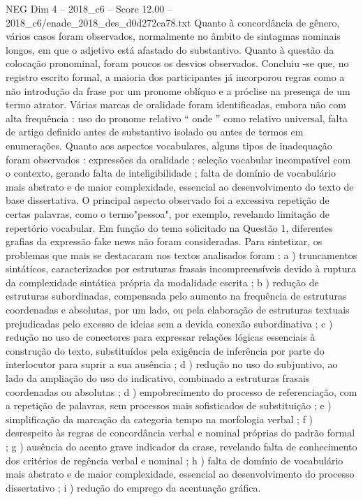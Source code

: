 \begin{textsample}{NEG Dim 4 – 2018\_c6 – Score 12.00 – 2018\_c6/enade\_2018\_des\_d0d272ca78.txt}
Quanto à concordância de gênero, vários casos foram observados, normalmente no âmbito de sintagmas nominais longos, em que o adjetivo está afastado do substantivo.
Quanto à questão da colocação pronominal, foram poucos os desvios observados.
Concluiu -se que, no registro escrito formal, a maioria dos participantes já incorporou regras como a não introdução da frase por um pronome oblíquo e a próclise na presença de um termo atrator.
Várias marcas de oralidade foram identificadas, embora não com alta frequência : uso do pronome relativo “ onde ” como relativo universal, falta de artigo definido antes de substantivo isolado ou antes de termos em enumerações.
Quanto aos aspectos vocabulares, alguns tipos de inadequação foram observados : expressões da oralidade ; seleção vocabular incompatível com o contexto, gerando falta de inteligibilidade ; falta de domínio de vocabulário mais abstrato e de maior complexidade, essencial ao desenvolvimento do texto de base dissertativa.
O principal aspecto observado foi a excessiva repetição de certas palavras, como o termo"pessoa", por exemplo, revelando limitação de repertório vocabular.
Em função do tema solicitado na Questão 1, diferentes grafias da expressão fake news não foram consideradas.
Para sintetizar, os problemas que mais se destacaram nos textos analisados foram : a ) truncamentos sintáticos, caracterizados por estruturas frasais incompreensíveis devido à ruptura da complexidade sintática própria da modalidade escrita ; b ) redução de estruturas subordinadas, compensada pelo aumento na frequência de estruturas coordenadas e absolutas, por um lado, ou pela elaboração de estruturas textuais prejudicadas pelo excesso de ideias sem a devida conexão subordinativa ; c ) redução no uso de conectores para expressar relações lógicas essenciais à construção do texto, substituídos pela exigência de inferência por parte do interlocutor para suprir a sua ausência ; d ) redução no uso do subjuntivo, ao lado da ampliação do uso do indicativo, combinado a estruturas frasais coordenadas ou absolutas ; d ) empobrecimento do processo de referenciação, com a repetição de palavras, sem processos mais sofisticados de substituição ; e ) simplificação da marcação da categoria tempo na morfologia verbal ; f ) desrespeito às regras de concordância verbal e nominal próprias do padrão formal ; g ) ausência do acento grave indicador da crase, revelando falta de conhecimento dos critérios de regência verbal e nominal ; h ) falta de domínio de vocabulário mais abstrato e de maior complexidade, essencial ao desenvolvimento do processo dissertativo ; i ) redução do emprego da acentuação gráfica.

\end{textsample}
